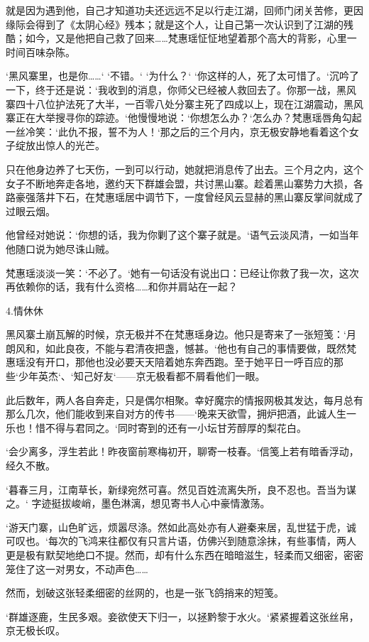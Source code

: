 就是因为遇到他，自己才知道功夫还远远不足以行走江湖，回师门闭关苦修，更因缘际会得到了《太阴心经》残本；就是这个人，让自己第一次认识到了江湖的残酷；如今，又是他把自己救了回来……梵惠瑶怔怔地望着那个高大的背影，心里一时间百味杂陈。

‘黑风寨里，也是你……‘ ‘不错。‘ ‘为什么？‘ ‘你这样的人，死了太可惜了。‘沉吟了一下，终于还是说：‘我收到的消息，你师父已经被人救回去了。你那一战，黑风寨四十八位护法死了大半，一百零八处分寨主死了四成以上，现在江湖震动，黑风寨正在大举搜寻你的踪迹。‘他慢慢地说：‘你想怎么办？‘怎么办？梵惠瑶唇角勾起一丝冷笑：‘此仇不报，誓不为人！‘那之后的三个月内，京无极安静地看着这个女子绽放出惊人的光芒。

只在他身边养了七天伤，一到可以行动，她就把消息传了出去。三个月之内，这个女子不断地奔走各地，邀约天下群雄会盟，共讨黑山寨。趁着黑山寨势力大损，各路豪强落井下石，在梵惠瑶居中调节下，一度曾经风云显赫的黑山寨反掌间就成了过眼云烟。

他曾经对她说：‘你想的话，我为你剿了这个寨子就是。‘语气云淡风清，一如当年他随口说为她尽诛山贼。

梵惠瑶淡淡一笑：‘不必了。‘她有一句话没有说出口：已经让你救了我一次，这次再依赖你的话，我有什么资格……和你并肩站在一起？

4.情休休

黑风寨土崩瓦解的时候，京无极并不在梵惠瑶身边。他只是寄来了一张短笺：‘月朗风和，如此良夜，不能与君清夜把盏，憾甚。‘他也有自己的事情要做，既然梵惠瑶没有开口，那他也没必要天天陪着她东奔西跑。至于她平日一呼百应的那些‘少年英杰‘、‘知己好友‘——京无极看都不屑看他们一眼。

此后数年，两人各自奔走，只是偶尔相聚。幸好魔宗的情报网极其发达，每月总有那么几次，他们能收到来自对方的传书——‘晚来天欲雪，拥炉把酒，此诚人生一乐也！惜不得与君同之。‘同时寄到的还有一小坛甘芳醇厚的梨花白。

‘会少离多，浮生若此！昨夜窗前寒梅初开，聊寄一枝春。‘信笺上若有暗香浮动，经久不散。

‘暮春三月，江南草长，新绿宛然可喜。然见百姓流离失所，良不忍也。吾当为谋之。‘ 字迹挺拔峻峭，墨色淋漓，想见寄书人心中豪情激荡。

‘游天门寨，山色旷远，烦嚣尽涤。然如此高处亦有人避秦来居，乱世猛于虎，诚可叹也。‘每次的飞鸿来往都仅有只言片语，仿佛兴到随意涂抹，有些事情，两人更是极有默契地绝口不提。然而，却有什么东西在暗暗滋生，轻柔而又细密，密密笼住了这一对男女，不动声色……

然而，划破这张轻柔细密的丝网的，也是一张飞鸽捎来的短笺。

‘群雄逐鹿，生民多艰。妾欲使天下归一，以拯黔黎于水火。‘紧紧握着这张丝帛，京无极长叹。

